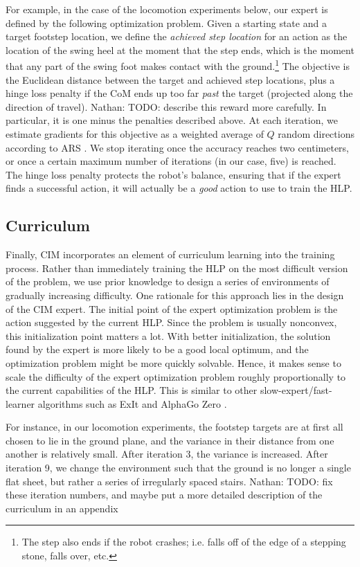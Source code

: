 \documentclass[conference]{IEEEtran}
\newcommand{\nhatch}[1]{{\leavevmode\color{magenta} Nathan: #1}}
\begin{document}
For example, in the case of the locomotion experiments below, our expert is defined by the following optimization problem.
Given a starting state and a target footstep location, we define the \emph{achieved step location} for an action as the location of the swing heel at the moment that the step ends, which is the moment that any part of the swing foot makes contact with the ground.\footnote{The step also ends if the robot crashes; i.e. falls off of the edge of a stepping stone, falls over, etc.}
The objective is the Euclidean distance between the target and achieved step locations,
plus a hinge loss penalty if the CoM ends up too far \emph{past} the target (projected along the direction of travel).
\nhatch{TODO: describe this reward more carefully. In particular, it is one minus the penalties described above.}
At each iteration, we estimate gradients for this objective as a weighted average of $Q$ random directions according to ARS \citep{mania2018simple}.
We stop iterating once the accuracy reaches two centimeters, or once a certain maximum number of iterations (in our case, five) is reached.
The hinge loss penalty protects the robot's balance, ensuring that if the expert finds a successful action, it will actually be a \emph{good} action to use to train the HLP.


\subsection{Curriculum} \label{sec:curriculum}

Finally, CIM incorporates an element of curriculum learning into the training process.
Rather than immediately training the HLP on the most difficult version of the problem,
we use prior knowledge to design a series of environments of gradually increasing difficulty.
One rationale for this approach lies in the design of the CIM expert.
The initial point of the expert optimization problem is the action suggested by the current HLP.
Since the problem is usually nonconvex, this initialization point matters a lot.
With better initialization, the solution found by the expert is more likely to be a good local optimum, and the optimization problem might be more quickly solvable.
Hence, it makes sense to scale the difficulty of the expert optimization problem roughly proportionally to the current capabilities of the HLP.
This is similar to other slow-expert/fast-learner algorithms such as ExIt \citep{anthony2017thinking} and AlphaGo Zero \citep{silver2017mastering}.

For instance, in our locomotion experiments, the footstep targets are at first all chosen to lie in the ground plane, and the variance in their distance from one another is relatively small.
After iteration 3, the variance is increased.
After iteration 9, we change the environment such that the ground is no longer a single flat sheet, but rather a series of irregularly spaced stairs.
\nhatch{TODO: fix these iteration numbers, and maybe put a more detailed description of the curriculum in an appendix}
\end{document}
